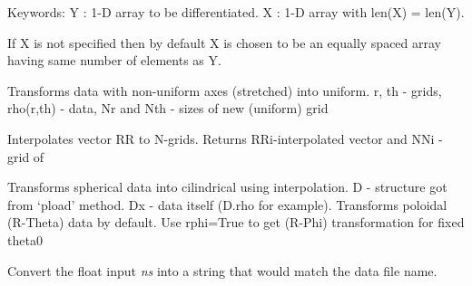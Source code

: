 \documentclass[letterpaper,10pt,english]{sphinxmanual}
\begin{document}
\begin{fulllineitems}
\begin{fulllineitems}
Keywords:
Y : 1-D array to be differentiated.
X : 1-D array with len(X) = len(Y).

If X is not specified then by default X is chosen to be an equally spaced array having same number of elements
as Y.

\end{fulllineitems}


\begin{fulllineitems}
\label{tools:pyPLUTO.Tools.getUniformGrid}
Transforms data with non-uniform axes (stretched) into uniform.
r, th - grids, rho(r,th) - data, Nr and Nth - sizes of new (uniform) grid

\end{fulllineitems}


\begin{fulllineitems}
\label{tools:pyPLUTO.Tools.myInterpol}
Interpolates vector RR to N-grids. Returns RRi-interpolated vector 
and NNi - grid of

\end{fulllineitems}


\begin{fulllineitems}
\label{tools:pyPLUTO.Tools.sph2cyl}
Transforms spherical data into cilindrical using interpolation. 
D - structure got from `pload' method. Dx - data itself (D.rho for example).
Transforms poloidal (R-Theta) data by default.
Use rphi=True to get (R-Phi) transformation for fixed theta0

\end{fulllineitems}


\end{fulllineitems}

\label{index:module-pyPLUTO}

\begin{fulllineitems}
\label{index:pyPLUTO.get_nstepstr}
Convert the float input \emph{ns} into a string that would match the data file name.

\end{fulllineitems}
\end{document}
